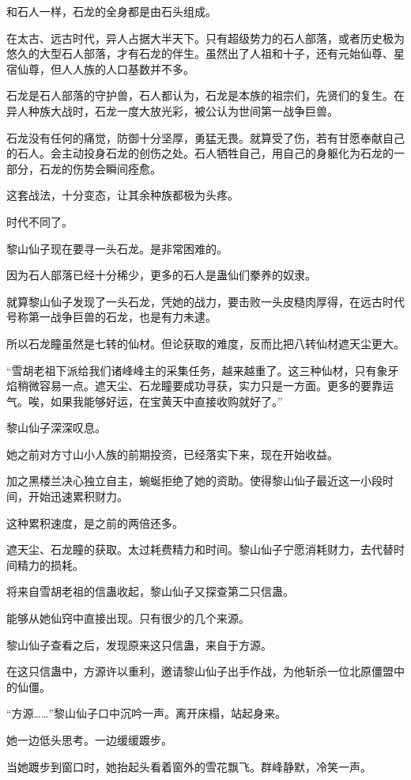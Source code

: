\begin{this_body}
和石人一样，石龙的全身都是由石头组成。

在太古、远古时代，异人占据大半天下。只有超级势力的石人部落，或者历史极为悠久的大型石人部落，才有石龙的伴生。虽然出了人祖和十子，还有元始仙尊、星宿仙尊，但人人族的人口基数并不多。

石龙是石人部落的守护兽，石人都认为，石龙是本族的祖宗们，先贤们的复生。在异人种族大战时，石龙一度大放光彩，被公认为世间第一战争巨兽。

石龙没有任何的痛觉，防御十分坚厚，勇猛无畏。就算受了伤，若有甘愿奉献自己的石人。会主动投身石龙的创伤之处。石人牺牲自己，用自己的身躯化为石龙的一部分，石龙的伤势会瞬间痊愈。

这套战法，十分变态，让其余种族都极为头疼。

时代不同了。

黎山仙子现在要寻一头石龙。是非常困难的。

因为石人部落已经十分稀少，更多的石人是蛊仙们豢养的奴隶。

就算黎山仙子发现了一头石龙，凭她的战力，要击败一头皮糙肉厚得，在远古时代号称第一战争巨兽的石龙，也是有力未逮。

所以石龙瞳虽然是七转的仙材。但论获取的难度，反而比把八转仙材遮天尘更大。

“雪胡老祖下派给我们诸峰峰主的采集任务，越来越重了。这三种仙材，只有象牙焰稍微容易一点。遮天尘、石龙瞳要成功寻获，实力只是一方面。更多的要靠运气。唉，如果我能够好运，在宝黄天中直接收购就好了。”

黎山仙子深深叹息。

她之前对方寸山小人族的前期投资，已经落实下来，现在开始收益。

加之黑楼兰决心独立自主，蜿蜒拒绝了她的资助。使得黎山仙子最近这一小段时间，开始迅速累积财力。

这种累积速度，是之前的两倍还多。

遮天尘、石龙瞳的获取。太过耗费精力和时间。黎山仙子宁愿消耗财力，去代替时间精力的损耗。

将来自雪胡老祖的信蛊收起，黎山仙子又探查第二只信蛊。

能够从她仙窍中直接出现。只有很少的几个来源。

黎山仙子查看之后，发现原来这只信蛊，来自于方源。

在这只信蛊中，方源许以重利，邀请黎山仙子出手作战，为他斩杀一位北原僵盟中的仙僵。

“方源……”黎山仙子口中沉吟一声。离开床榻，站起身来。

她一边低头思考。一边缓缓踱步。

当她踱步到窗口时，她抬起头看着窗外的雪花飘飞。群峰静默，冷笑一声。


\end{this_body}
